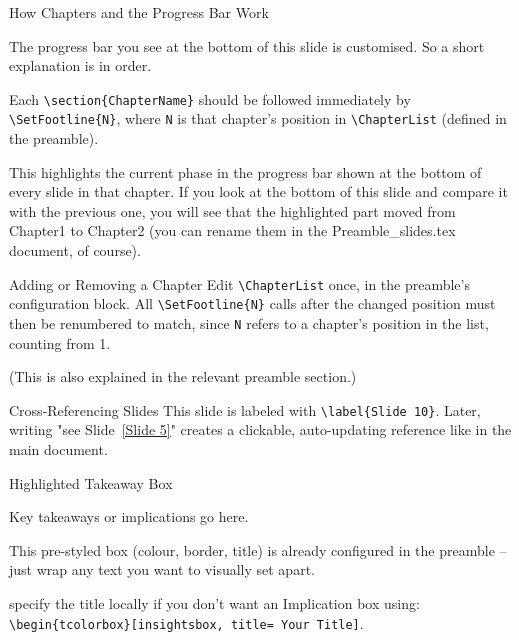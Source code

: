 \begin{frame}{How Chapters and the Progress Bar Work}

The progress bar you see at the bottom of this slide is customised. So a short explanation is in order.

\vspace{0.3cm}
Each \texttt{\textbackslash section\{ChapterName\}} should be followed immediately by \texttt{\textbackslash SetFootline\{N\}}, where \texttt{N} is that chapter's position in \texttt{\textbackslash ChapterList} (defined in the preamble).

\vspace{0.3cm}
This highlights the current phase in the progress bar shown at the bottom of every slide in that chapter. If you look at the bottom of this slide and compare it with the previous one, you will see that the highlighted part moved from Chapter1 to Chapter2 (you can rename them in the Preamble\_slides.tex document, of course).
\end{frame}

\begin{frame}{Adding or Removing a Chapter}
Edit \texttt{\textbackslash ChapterList} once, in the preamble's configuration block. All \texttt{\textbackslash SetFootline\{N\}} calls after the changed position must then be renumbered to match, since \texttt{N} refers to a chapter's position in the list, counting from 1.

\vspace{0.3cm}
(This is also explained in the relevant preamble section.)
\end{frame}

\begin{frame}{Cross-Referencing Slides}
\label{Slide 5}
This slide is labeled with \texttt{\textbackslash label\{Slide 10\}}. Later, writing "see Slide~\ref{Slide 5}" creates a clickable, auto-updating reference like in the main document.
\end{frame}

\begin{frame}[c]{Highlighted Takeaway Box}
\begin{tcolorbox}[insightsbox]
Key takeaways or implications go here.
\end{tcolorbox} 

\vspace{0.3cm}
This pre-styled box (colour, border, title) is already configured in the preamble -- just wrap any text you want to visually set apart.

\vspace{0.3cm}

specify the title locally if you don't want an Implication box using: \texttt{\textbackslash begin\{tcolorbox\}[insightsbox, title= Your Title]}.

\end{frame}

